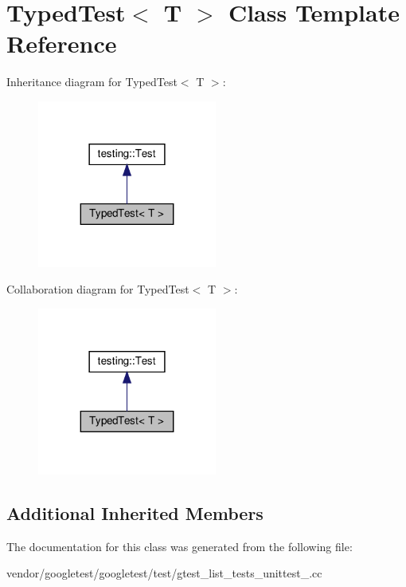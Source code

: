 \hypertarget{class_typed_test}{}\section{Typed\+Test$<$ T $>$ Class Template Reference}
\label{class_typed_test}


Inheritance diagram for Typed\+Test$<$ T $>$\+:
\nopagebreak
\begin{figure}[H]
\begin{center}
\leavevmode
\includegraphics[width=167pt]{class_typed_test__inherit__graph}
\end{center}
\end{figure}


Collaboration diagram for Typed\+Test$<$ T $>$\+:
\nopagebreak
\begin{figure}[H]
\begin{center}
\leavevmode
\includegraphics[width=167pt]{class_typed_test__coll__graph}
\end{center}
\end{figure}
\subsection*{Additional Inherited Members}


The documentation for this class was generated from the following file\+:\begin{DoxyCompactItemize}
\item 
vendor/googletest/googletest/test/gtest\+\_\+list\+\_\+tests\+\_\+unittest\+\_\+.\+cc\end{DoxyCompactItemize}

